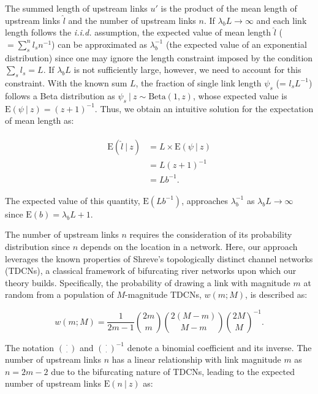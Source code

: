 \documentclass[11pt, class=article, crop=false]{standalone}
\begin{document}
The summed length of upstream links $u'$ is the product of the mean length of upstream links $\hat{l}$ and the number of upstream links $n$.
If $\lambda_b L \rightarrow \infty$ and each link length follows the \textit{i.i.d.} assumption, the expected value of mean length $\hat{l}$ ($= \sum_s^n l_s n^{-1}$) can be approximated as $\lambda_b^{-1}$ (the expected value of an exponential distribution) since one may ignore the length constraint imposed by the condition $\sum_s l_s = L$.
If $\lambda_b L$ is not sufficiently large, however, we need to account for this constraint.
With the known sum $L$, the fraction of single link length $\psi_s$ (= $l_s L^{-1}$) follows a Beta distribution as $\psi_s ~|~ z \sim \mbox{Beta}(1, z)$, whose expected value is $\mbox{E}(\psi~|~z) = (z + 1)^{-1}$.
Thus, we obtain an intuitive solution for the expectation of mean length as:

\begin{align}
    \begin{split}
    \mbox{E}(\hat{l}~|~z) &= L \times \mbox{E}(\psi~|~z)\\
                          &= L(z + 1)^{-1}\\
                          &= Lb^{-1}.
    \end{split}
\end{align}

The expected value of this quantity, $\mbox{E}(Lb^{-1})$, approaches $\lambda_b^{-1}$ as $\lambda_b L \rightarrow \infty$ since $\mbox{E}(b) = \lambda_b L + 1$.

The number of upstream links $n$ requires the consideration of its probability distribution since $n$ depends on the location in a network.
Here, our approach leverages the known properties of Shreve's topologically distinct channel networks (TDCNs), a classical framework of bifurcating river networks upon which our theory builds.
Specifically, the probability of drawing a link with magnitude $m$ at random from a population of $M$-magnitude TDCNs, $w(m; M)$, is described as:

\begin{equation}
    w(m; M) = \frac{1}{2m - 1} \binom{2m}{m} \binom{2(M - m)}{M - m} \binom{2M}{M}^{-1}.
\end{equation}

The notation $\binom{\cdot}{\cdot}$ and $\binom{\cdot}{\cdot}^{-1}$ denote a binomial coefficient and its inverse.
The number of upstream links $n$ has a linear relationship with link magnitude $m$ as $n = 2m - 2$ due to the bifurcating nature of TDCNs, leading to the expected number of upstream links $\mbox{E}(n~|~z)$ as:
\end{document}
